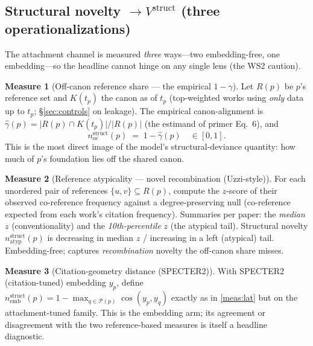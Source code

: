 \documentclass[11pt,letterpaper]{article}
\theoremstyle{definition}
\newtheorem{measure}{Measure}
\theoremstyle{plain}
\newcommand{\Vstruct}{V^{\mathrm{struct}}}
\newcommand{\card}[1]{\lvert #1 \rvert}
\begin{document}
\subsection{Structural novelty $\to \Vstruct$ (three operationalizations)}\label{sec:struct}

The attachment channel is measured \emph{three} ways---two embedding-free, one
embedding---so the headline cannot hinge on any single lens (the WS2 caution).

\begin{measure}[Off-canon reference share --- the empirical $1-\gamma$]\label{meas:offcanon}
Let $R(p)$ be $p$'s reference set and $K(t_p)$ the canon as of $t_p$ (top-weighted
works using \emph{only} data up to $t_p$; \S\ref{sec:controls} on leakage). The
empirical canon-alignment is $\hat\gamma(p) = \card{R(p)\cap K(t_p)}/\card{R(p)}$
(the estimand of primer Eq.~6), and
\begin{equation}
  n^{\mathrm{struct}}_{\mathrm{oc}}(p) \;=\; 1 - \hat\gamma(p)
  \quad\in[0,1].
\end{equation}
This is the most direct image of the model's structural-deviance quantity: how
much of $p$'s foundation lies off the shared canon.
\end{measure}

\begin{measure}[Reference atypicality --- novel recombination (Uzzi-style)]\label{meas:atyp}
For each unordered pair of references $\{u,v\}\subseteq R(p)$, compute the
$z$-score of their observed co-reference frequency against a degree-preserving
null (co-reference expected from each work's citation frequency). Summaries per
paper: the \emph{median} $z$ (conventionality) and the \emph{10th-percentile}
$z$ (the atypical tail). Structural novelty
$n^{\mathrm{struct}}_{\mathrm{atyp}}(p)$ is decreasing in median $z$ / increasing
in a left (atypical) tail. Embedding-free; captures \emph{recombination} novelty
the off-canon share misses.
\end{measure}

\begin{measure}[Citation-geometry distance (SPECTER2)]\label{meas:s2}
With SPECTER2 (citation-tuned) embedding $y_p$, define
$n^{\mathrm{struct}}_{\mathrm{emb}}(p) = 1 - \max_{q\in\mathcal{P}(p)} \cos(y_p,y_q)$
exactly as in \cref{meas:lat} but on the attachment-tuned family. This is the
embedding arm; its agreement or disagreement with the two reference-based
measures is itself a headline diagnostic.
\end{measure}
\end{document}
